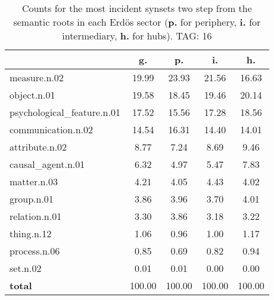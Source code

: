 \begin{table}[h!]
\begin{center}
\begin{tabular}{| l | c | c | c | c |}\hline
 & g. & p. & i. & h. \\\hline
measure.n.02 & 19.99  & 23.93  & 21.56  & 16.63 \\\hline
object.n.01 & 19.58  & 18.45  & 19.46  & 20.14 \\\hline
psychological\_feature.n.01 & 17.52  & 15.56  & 17.28  & 18.56 \\\hline
communication.n.02 & 14.54  & 16.31  & 14.40  & 14.01 \\\hline
attribute.n.02 & 8.77  & 7.24  & 8.69  & 9.46 \\\hline
causal\_agent.n.01 & 6.32  & 4.97  & 5.47  & 7.83 \\\hline
matter.n.03 & 4.21  & 4.05  & 4.43  & 4.02 \\\hline
group.n.01 & 3.86  & 3.96  & 3.70  & 4.01 \\\hline
relation.n.01 & 3.30  & 3.86  & 3.18  & 3.22 \\\hline
thing.n.12 & 1.06  & 0.96  & 1.00  & 1.17 \\\hline
process.n.06 & 0.85  & 0.69  & 0.82  & 0.94 \\\hline
set.n.02 & 0.01  & 0.01  & 0.00  & 0.00 \\\hline
{{\bf total}} & 100.00  & 100.00  & 100.00  & 100.00 \\\hline
\end{tabular}
\caption{Counts for the most incident synsets two step from the semantic roots in each Erd\"os sector ({\bf p.} for periphery, {\bf i.} for intermediary, {\bf h.} for hubs). TAG: 16}
\end{center}
\end{table}